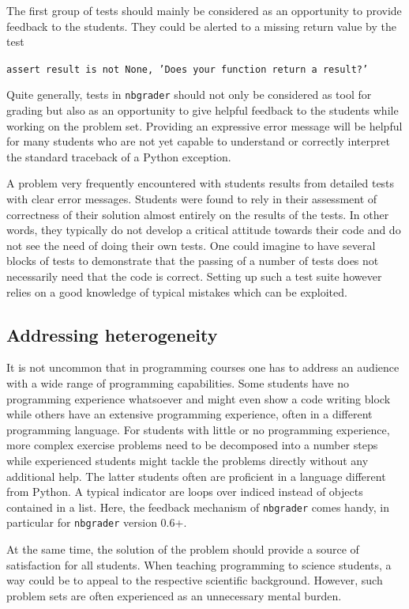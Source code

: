 \documentclass[twocolumn]{svjour3}          %
\begin{document}
The first group of tests should mainly be considered as an opportunity to
provide feedback to the students. They could be alerted to a missing return
value by the test

\noindent\texttt{assert result is not None, 'Does your function return
a result?'}

Quite generally, tests in \texttt{nbgrader} should not only be considered as
tool for grading but also as an opportunity to give helpful feedback to the
students while working on the problem set. Providing an expressive error
message will be helpful for many students who are not yet capable to understand
or correctly interpret the standard traceback of a Python exception. 

A problem very frequently encountered with students results from detailed 
tests with clear error messages. Students were found to rely in their assessment
of correctness of their solution almost entirely on the results of the tests.
In other words, they typically do not develop a critical attitude towards their
code and do not see the need of doing their own tests. One could imagine to
have several blocks of tests to demonstrate that the passing of a number of
tests does not necessarily need that the code is correct. Setting up such a
test suite however relies on a good knowledge of typical mistakes which can
be exploited.

\subsection{Addressing heterogeneity}

It is not uncommon that in programming courses one has to address an audience
with a wide range of programming capabilities. Some students have no
programming experience whatsoever and might even show a code writing block
while others have an extensive programming experience, often in a different
programming language. For students with little or no programming experience,
more complex exercise problems need to be decomposed into a number steps while
experienced students might tackle the problems directly without any additional
help. The latter students often are proficient in a language different from
Python. A typical indicator are loops over indiced instead of objects contained
in a list. Here, the feedback mechanism of \texttt{nbgrader} comes handy, in
particular for \texttt{nbgrader} version 0.6+.

At the same time, the solution of the problem should provide a source of
satisfaction for all students. When teaching programming to science students, a
way could be to appeal to the respective scientific background. However, such
problem sets are often experienced as an unnecessary mental burden.
\end{document}
